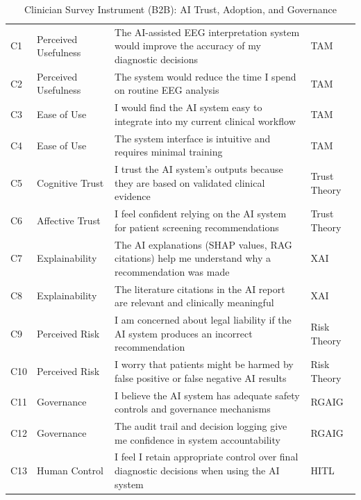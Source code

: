 \begin{table}[p]
\tablestripes
\tablefontsize
\caption{Clinician Survey Instrument (B2B): AI Trust, Adoption, and Governance}
\begin{tabularx}{\textwidth}{@{} >{\raggedright\arraybackslash}p{0.5cm} >{\raggedright\arraybackslash}p{2.2cm} L >{\raggedright\arraybackslash}p{1.5cm} @{}}
\toprule
\thead{\#} &  &  &  \\
\midrule
C1 & Perceived Usefulness & The AI-assisted EEG interpretation system would improve the accuracy of my diagnostic decisions & TAM \\
\addlinespace
C2 & Perceived Usefulness & The system would reduce the time I spend on routine EEG analysis & TAM \\
\addlinespace
C3 & Ease of Use & I would find the AI system easy to integrate into my current clinical workflow & TAM \\
\addlinespace
C4 & Ease of Use & The system interface is intuitive and requires minimal training & TAM \\
\addlinespace
C5 & Cognitive Trust & I trust the AI system's outputs because they are based on validated clinical evidence & Trust Theory \\
\addlinespace
C6 & Affective Trust & I feel confident relying on the AI system for patient screening recommendations & Trust Theory \\
\addlinespace
C7 & Explainability & The AI explanations (SHAP values, RAG citations) help me understand why a recommendation was made & XAI \\
\addlinespace
C8 & Explainability & The literature citations in the AI report are relevant and clinically meaningful & XAI \\
\addlinespace
C9 & Perceived Risk & I am concerned about legal liability if the AI system produces an incorrect recommendation & Risk Theory \\
\addlinespace
C10 & Perceived Risk & I worry that patients might be harmed by false positive or false negative AI results & Risk Theory \\
\addlinespace
C11 & Governance & I believe the AI system has adequate safety controls and governance mechanisms & RGAIG \\
\addlinespace
C12 & Governance & The audit trail and decision logging give me confidence in system accountability & RGAIG \\
\addlinespace
C13 & Human Control & I feel I retain appropriate control over final diagnostic decisions when using the AI system & HITL \\

\end{tabularx}
\end{table}

